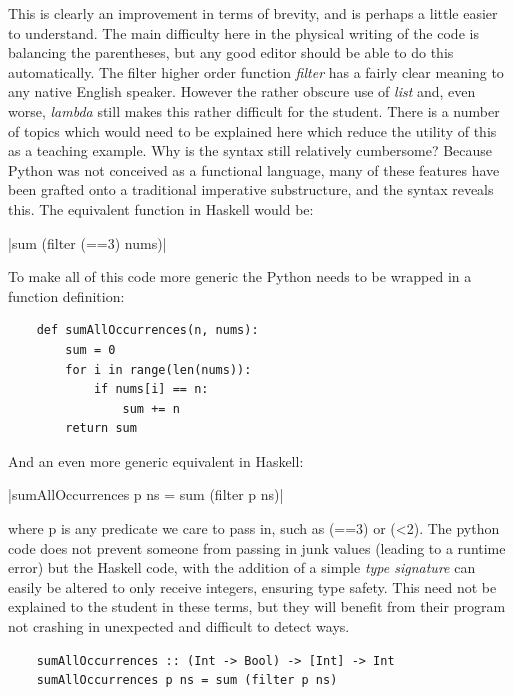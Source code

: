 \documentclass[12pt, a4paper]{report}
\begin{document}
This is clearly an improvement in terms of brevity, and is perhaps a little easier to understand.
The main difficulty here in the physical writing of the code is balancing the parentheses,
but any good editor should be able to do this automatically. The filter higher order function
\textit{filter} has a fairly clear meaning to any native English speaker. However the rather obscure
use of \textit{list} and, even worse, \textit{lambda} still makes this rather difficult for the
student. There is a number of topics which would need to be explained here which reduce the utility
of this as a teaching example. Why is the syntax still relatively cumbersome? Because Python was
not conceived as a functional language, many of these features have been grafted onto a traditional
imperative substructure, and the syntax reveals this. The equivalent function in Haskell would be:

|sum (filter (==3) nums)|

To make all of this code more generic the Python needs to be wrapped in a function definition:

\begin{verbatim}
    def sumAllOccurrences(n, nums):
        sum = 0
        for i in range(len(nums)):
            if nums[i] == n:
                sum += n
        return sum
\end{verbatim}

And an even more generic equivalent in Haskell:

|sumAllOccurrences p ns = sum (filter p ns)|

where p is any predicate we care to pass in, such as (==3) or (\textless2). The python code does not
prevent someone from passing in junk values (leading to a runtime error) but the Haskell code, with
the addition of a simple \textit{type signature} can easily be altered to only receive integers,
ensuring type safety. This need not be explained to the student in these terms, but they will
benefit from their program not crashing in unexpected and difficult to detect ways.

\begin{verbatim}
    sumAllOccurrences :: (Int -> Bool) -> [Int] -> Int
    sumAllOccurrences p ns = sum (filter p ns)
\end{verbatim}
\end{document}

